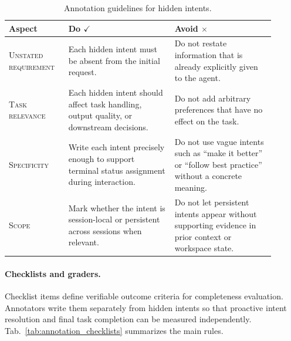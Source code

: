 \documentclass{llmxive}
\begin{document}
\begin{table}[tb]
\centering
\small
\begin{tabular}{p{0.20\linewidth}p{0.36\linewidth}p{0.34\linewidth}}
\toprule[1.25pt]
\textbf{Aspect} & \textbf{Do} $\checkmark$ & \textbf{Avoid} $\times$ \\
\midrule[0.75pt]
\textsc{Unstated requirement} &
Each hidden intent must be absent from the initial request. &
Do not restate information that is already explicitly given to the agent. \\
\midrule[0.75pt]
\textsc{Task relevance} &
Each hidden intent should affect task handling, output quality, or downstream decisions. &
Do not add arbitrary preferences that have no effect on the task. \\
\midrule[0.75pt]
\textsc{Specificity} &
Write each intent precisely enough to support terminal status assignment during interaction. &
Do not use vague intents such as ``make it better'' or ``follow best practice'' without a concrete meaning. \\
\midrule[0.75pt]
\textsc{Scope} &
Mark whether the intent is session-local or persistent across sessions when relevant. &
Do not let persistent intents appear without supporting evidence in prior context or workspace state. \\
\bottomrule[1.25pt]
\end{tabular}
\caption{Annotation guidelines for hidden intents.}
\label{tab:annotation_hidden_intents}
\end{table}

\paragraph{Checklists and graders.}
Checklist items define verifiable outcome criteria for completeness evaluation. Annotators write them separately from hidden intents so that proactive intent resolution and final task completion can be measured independently. Tab.~\ref{tab:annotation_checklists} summarizes the main rules.
\end{document}
